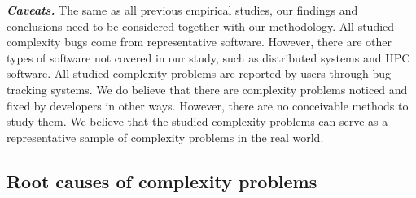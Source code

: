 {\bf{\textit{Caveats.}}}
The same as all previous empirical studies, 
our findings and conclusions need to be considered together with our methodology.
All studied complexity bugs come from representative software. 
However, there are other types of software not covered in our study, 
such as distributed systems and HPC software. 
All studied complexity problems are reported by users through bug tracking systems.  
We do believe that there are complexity problems noticed 
and fixed by developers in other ways. 
However, there are no conceivable methods to study them.
We believe that the studied complexity problems can serve as a representative sample
of complexity problems in the real world. 


\subsection{Root causes of complexity problems}


